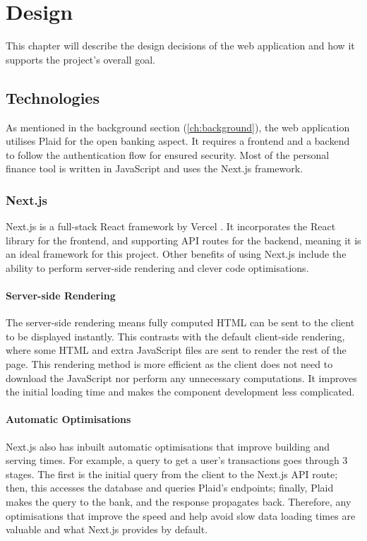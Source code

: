 \chapter{Design}
\label{ch:design}

This chapter will describe the design decisions of the web application and how it supports the project's overall goal.

\section{Technologies}
\label{sec:technologies}
As mentioned in the background section (\ref{ch:background}), the web application utilises Plaid for the open banking aspect. It requires a frontend and a backend to follow the authentication flow for ensured security. Most of the personal finance tool is written in JavaScript and uses the Next.js framework.

\subsection{Next.js}
Next.js is a full-stack React framework by Vercel \cite{Next.js}. It incorporates the React library for the frontend, and supporting API routes for the backend, meaning it is an ideal framework for this project. Other benefits of using Next.js include the ability to perform server-side rendering and clever code optimisations.

\subsubsection{Server-side Rendering}
The server-side rendering means fully computed HTML can be sent to the client to be displayed instantly. This contrasts with the default client-side rendering, where some HTML and extra JavaScript files are sent to render the rest of the page. This rendering method is more efficient as the client does not need to download the JavaScript nor perform any unnecessary computations. It improves the initial loading time and makes the component development less complicated.

\subsubsection{Automatic Optimisations}
Next.js also has inbuilt automatic optimisations that improve building and serving times. For example, a query to get a user's transactions goes through 3 stages. The first is the initial query from the client to the Next.js API route; then, this accesses the database and queries Plaid's endpoints; finally, Plaid makes the query to the bank, and the response propagates back. Therefore, any optimisations that improve the speed and help avoid slow data loading times are valuable and what Next.js provides by default.

